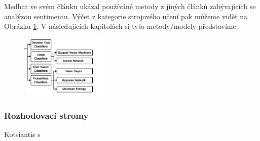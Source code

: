 Medhat ve svém článku ukázal používáné metody z jiných článků zabývajících se analýzou sentimentu. \cite{Medhat} Výčet z kategorie strojového učení pak můžeme vidět na Obrázku \ref{fig:MedhatML}. V následujících kapitolách si tyto metody/modely představíme.

\begin{figure}[h]
    \centering
    \includegraphics[height=3cm]{text/img/medhatML.PNG}
    \caption{}
    \label{fig:MedhatML}
\end{figure}

\subsubsection*{Rozhodovací stromy}
Kotsiantis \cite[překlad vlastní]{bibid}s